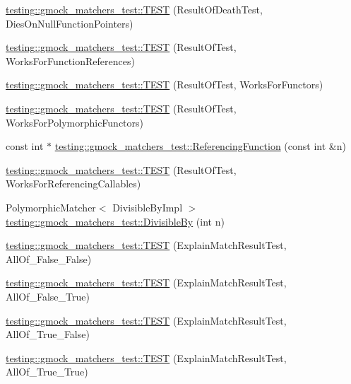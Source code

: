 \begin{DoxyCompactItemize}
\item 
\hyperlink{namespacetesting_1_1gmock__matchers__test_a4c929e5b46a503a9bb48c8b88dcbbf2a}{testing\+::gmock\+\_\+matchers\+\_\+test\+::\+T\+E\+ST} (Result\+Of\+Death\+Test, Dies\+On\+Null\+Function\+Pointers)
\item 
\hyperlink{namespacetesting_1_1gmock__matchers__test_a1638ee6460100cbe21c65b6cdc06579a}{testing\+::gmock\+\_\+matchers\+\_\+test\+::\+T\+E\+ST} (Result\+Of\+Test, Works\+For\+Function\+References)
\item 
\hyperlink{namespacetesting_1_1gmock__matchers__test_a19b7a39915f7ad5a0b741caf7ae4e619}{testing\+::gmock\+\_\+matchers\+\_\+test\+::\+T\+E\+ST} (Result\+Of\+Test, Works\+For\+Functors)
\item 
\hyperlink{namespacetesting_1_1gmock__matchers__test_a976290e53e319b06c51a94f7e450d765}{testing\+::gmock\+\_\+matchers\+\_\+test\+::\+T\+E\+ST} (Result\+Of\+Test, Works\+For\+Polymorphic\+Functors)
\item 
const int $\ast$ \hyperlink{namespacetesting_1_1gmock__matchers__test_af3164fc302e0b727c1eb745bdeb959f6}{testing\+::gmock\+\_\+matchers\+\_\+test\+::\+Referencing\+Function} (const int \&n)
\item 
\hyperlink{namespacetesting_1_1gmock__matchers__test_a00ee08657c9e9e0c306be7b84cd2848c}{testing\+::gmock\+\_\+matchers\+\_\+test\+::\+T\+E\+ST} (Result\+Of\+Test, Works\+For\+Referencing\+Callables)
\item 
Polymorphic\+Matcher$<$ Divisible\+By\+Impl $>$ \hyperlink{namespacetesting_1_1gmock__matchers__test_ac5b1fd3b6a8141c7e83ef6040ed4630f}{testing\+::gmock\+\_\+matchers\+\_\+test\+::\+Divisible\+By} (int n)
\item 
\hyperlink{namespacetesting_1_1gmock__matchers__test_aa9a60a406d9f495de8c8552abf577dd1}{testing\+::gmock\+\_\+matchers\+\_\+test\+::\+T\+E\+ST} (Explain\+Match\+Result\+Test, All\+Of\+\_\+\+False\+\_\+\+False)
\item 
\hyperlink{namespacetesting_1_1gmock__matchers__test_a099aebb5417d5bd85e11aefe935ec345}{testing\+::gmock\+\_\+matchers\+\_\+test\+::\+T\+E\+ST} (Explain\+Match\+Result\+Test, All\+Of\+\_\+\+False\+\_\+\+True)
\item 
\hyperlink{namespacetesting_1_1gmock__matchers__test_a5d386691eaed59994a1d2b65f94b23a9}{testing\+::gmock\+\_\+matchers\+\_\+test\+::\+T\+E\+ST} (Explain\+Match\+Result\+Test, All\+Of\+\_\+\+True\+\_\+\+False)
\item 
\hyperlink{namespacetesting_1_1gmock__matchers__test_a16545b298640b253502d604f52ea95e2}{testing\+::gmock\+\_\+matchers\+\_\+test\+::\+T\+E\+ST} (Explain\+Match\+Result\+Test, All\+Of\+\_\+\+True\+\_\+\+True)

\end{DoxyCompactItemize}
